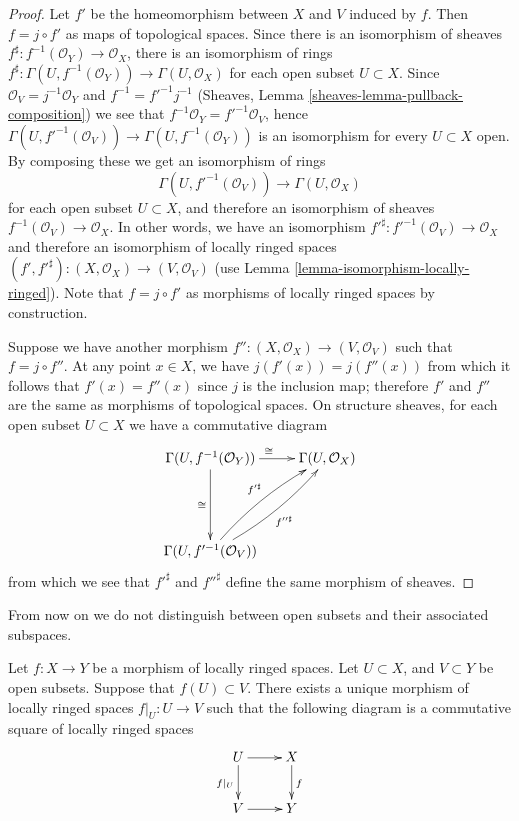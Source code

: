 \begin{proof}
Let $f'$ be the homeomorphism between $X$ and $V$ induced by $f$. Then
$f = j \circ f'$ as maps of topological spaces. Since there
is an isomorphism of sheaves
$f^\sharp : f^{-1}(\mathcal{O}_Y) \to \mathcal{O}_X$, there is an isomorphism
of rings
$f^\sharp : \Gamma(U, f^{-1}(\mathcal{O}_Y)) \to \Gamma(U, \mathcal{O}_X)$
for each open subset $U \subset X$. Since
$\mathcal{O}_V = j^{-1}\mathcal{O}_Y$ and $f^{-1} = f'^{-1} j^{-1}$
(Sheaves, Lemma \ref{sheaves-lemma-pullback-composition}) we
see that $f^{-1}\mathcal{O}_Y = f'^{-1}\mathcal{O}_V$, hence
$\Gamma(U, f'^{-1}(\mathcal{O}_V)) \to \Gamma(U, f^{-1}(\mathcal{O}_Y))$
is an isomorphism
for every $U \subset X$ open. By composing these we get an isomorphism of rings
$$
\Gamma(U, f'^{-1}(\mathcal{O}_V)) \to \Gamma(U, \mathcal{O}_X)
$$
for each open subset $U \subset X$, and therefore an isomorphism of sheaves
$f^{-1}(\mathcal{O}_V) \to \mathcal{O}_X$. In other words, we have an
isomorphism $f'^{\sharp} : f'^{-1}(\mathcal{O}_V) \to \mathcal{O}_X$ and
therefore an isomorphism of locally ringed spaces
$(f', f'^{\sharp}) : (X, \mathcal{O}_X) \to (V, \mathcal{O}_V)$
(use Lemma \ref{lemma-isomorphism-locally-ringed}).
Note that $f = j \circ f'$ as morphisms of locally ringed spaces
by construction.

\medskip\noindent
Suppose we have another morphism
$f'' : (X, \mathcal{O}_X) \to (V, \mathcal{O}_V)$ such that $f = j \circ f''$.
At any point $x \in X$, we have $j(f'(x)) = j(f''(x))$ from which it follows
that $f'(x) = f''(x)$ since $j$ is the inclusion map; therefore $f'$ and $f''$
are the same as morphisms of topological spaces. On structure sheaves,
for each open subset $U \subset X$ we have a commutative diagram
$$
\xymatrix @R=5em{
\Gamma(U, f^{-1}(\mathcal{O}_Y)) \ar[d]_\cong\ar[r]^\cong &
\Gamma(U, \mathcal{O}_X) \\
\Gamma(U, f'^{-1}(\mathcal{O}_V)) \ar@/^/[ru]^{f'^\sharp}
\ar@/_/[ru]_{f''^\sharp} &
}
$$
from which we see that $f'^\sharp$ and $f''^\sharp$ define
the same morphism of sheaves.
\end{proof}

\noindent
From now on we do not distinguish between open subsets
and their associated subspaces.

\begin{lemma}
\label{lemma-restrict-map-to-opens}
Let $f : X \to Y$ be a morphism of locally ringed spaces.
Let $U \subset X$, and $V \subset Y$ be open subsets.
Suppose that $f(U) \subset V$. There exists a unique
morphism of locally ringed spaces $f|_U : U \to V$ such
that the following diagram is a commutative square of
locally ringed spaces
$$
\xymatrix{
U \ar[d]_{f|_U} \ar[r] & X \ar[d]^f \\
V \ar[r] & Y
}
$$
\end{lemma}


